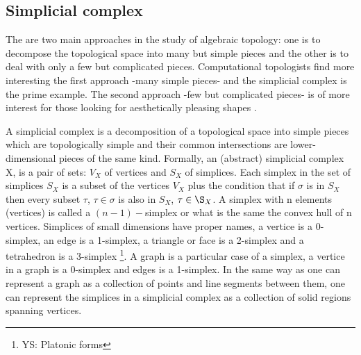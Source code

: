 \documentclass[onecollarge,runningheads]{svjour2}
\begin{document}


\subsection{Simplicial complex} 


The are two main approaches in the study of algebraic topology: one is to decompose the topological space into many but simple pieces and the other is to deal with only a few but complicated pieces. Computational topologists find more interesting the first approach -many simple pieces- and the simplicial complex is the prime example. The second approach -few but complicated pieces- is of more interest for those looking for aesthetically pleasing shapes \cite{edelsbrunner2010computational}. %

A simplicial complex is a decomposition of a topological space into simple pieces  which are topologically simple and their common intersections are lower-dimensional pieces of the same kind. Formally, an (abstract) simplicial complex X, is a pair of sets: $V_X$ of vertices and $S_X$ of simplices. Each simplex in the set of simplices $S_X$ is a subset of the vertices $V_X$ plus the condition that if $\sigma$ is in $S_X$ then every subset $\tau$, $\tau \in \sigma$ is also in $S_X$, $\tau \in \S_X$.
A simplex with n elements (vertices) is called a $(n-1)-$simplex or what is the same the convex hull of n vertices. Simplices of small dimensions have proper names, a vertice is a 0-simplex, an edge is a 1-simplex, a triangle or face is a 2-simplex and a tetrahedron is a 3-simplex \footnote{YS: Platonic forms}. A graph is a particular case of a simplex, a vertice in a graph is a 0-simplex and edges is a 1-simplex. In the same way as one can represent a graph as a collection of points and line segments between them, one can represent the simplices in a simplicial complex as a collection of solid regions spanning vertices.
\end{document}
